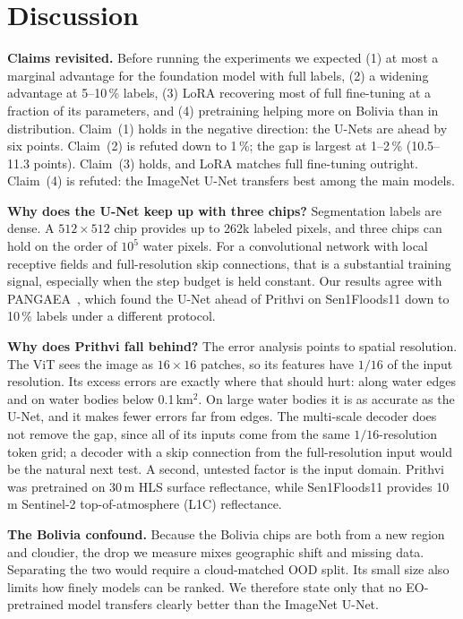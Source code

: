 \documentclass[conference]{IEEEtran}
\begin{document}
\section{Discussion}
\label{sec:discussion}
\textbf{Claims revisited.} Before running the experiments we expected (1) at most a marginal advantage for the foundation model with full labels, (2) a widening advantage at 5--10\,\% labels, (3) LoRA recovering most of full fine-tuning at a fraction of its parameters, and (4) pretraining helping more on Bolivia than in distribution. Claim~(1) holds in the negative direction: the U-Nets are ahead by six points. Claim~(2) is refuted down to 1\,\%; the gap is largest at 1--2\,\% (10.5--11.3 points). Claim~(3) holds, and LoRA matches full fine-tuning outright. Claim~(4) is refuted: the ImageNet U-Net transfers best among the main models.

\textbf{Why does the U-Net keep up with three chips?} Segmentation labels are dense. A $512\times512$ chip provides up to 262k labeled pixels, and three chips can hold on the order of $10^5$ water pixels. For a convolutional network with local receptive fields and full-resolution skip connections, that is a substantial training signal, especially when the step budget is held constant. Our results agree with PANGAEA~\cite{marsocci2024pangaea}, which found the U-Net ahead of Prithvi on Sen1Floods11 down to 10\,\% labels under a different protocol.

\textbf{Why does Prithvi fall behind?} The error analysis points to spatial resolution. The ViT sees the image as $16\times16$ patches, so its features have $1/16$ of the input resolution. Its excess errors are exactly where that should hurt: along water edges and on water bodies below 0.1\,km$^2$. On large water bodies it is as accurate as the U-Net, and it makes fewer errors far from edges. The multi-scale decoder does not remove the gap, since all of its inputs come from the same $1/16$-resolution token grid; a decoder with a skip connection from the full-resolution input would be the natural next test. A second, untested factor is the input domain. Prithvi was pretrained on 30\,m HLS surface reflectance, while Sen1Floods11 provides 10\,m Sentinel-2 top-of-atmosphere (L1C) reflectance.

\textbf{The Bolivia confound.} Because the Bolivia chips are both from a new region and cloudier, the drop we measure mixes geographic shift and missing data. Separating the two would require a cloud-matched OOD split. Its small size also limits how finely models can be ranked. We therefore state only that no EO-pretrained model transfers clearly better than the ImageNet U-Net.
\end{document}
